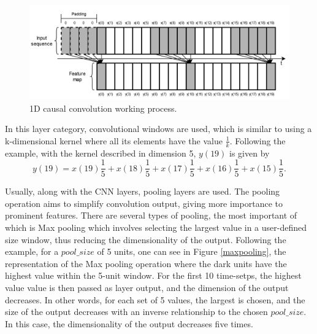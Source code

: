 \begin{figure}[h!]
    \centering
    \begin{center}
    \includegraphics[width=1\textwidth]{Images/conv2.png}
    \caption{1D causal convolution working process.}
    \label{conv2}
    \end{center}
\end{figure}

In this layer category, convolutional windows are used, which is similar to using a k-dimensional kernel where all its elements have the value $\frac{1}{k}$. Following the example, with the kernel described in dimension 5, $y(19)$ is given by
\begin{equation}
        y(19)=x(19)\frac{1}{5}+x(18)\frac{1}{5}+x(17)\frac{1}{5}+x(16)\frac{1}{5}+x(15)\frac{1}{5}.
    \label{19}
\end{equation}



Usually, along with the \ac{CNN} layers, pooling layers are used. The pooling operation aims to simplify convolution output, giving more importance to prominent features. There are several types of pooling, the most important of which is Max pooling which involves selecting the largest value in a user-defined size window, thus reducing the dimensionality of the output. Following the example, for a $pool\_size$ of 5 units, one can see in Figure \ref{maxpooling}, the representation of the Max pooling operation where the dark units have the highest value within the 5-unit window. For the first 10 time-setps, the highest value value is then passed as layer output, and the dimension of the output decreases. In other words, for each set of 5 values, the largest is chosen, and the size of the output decreases with an inverse relationship to the chosen $pool\_size$. In this case, the dimensionality of the output decreases five times.

